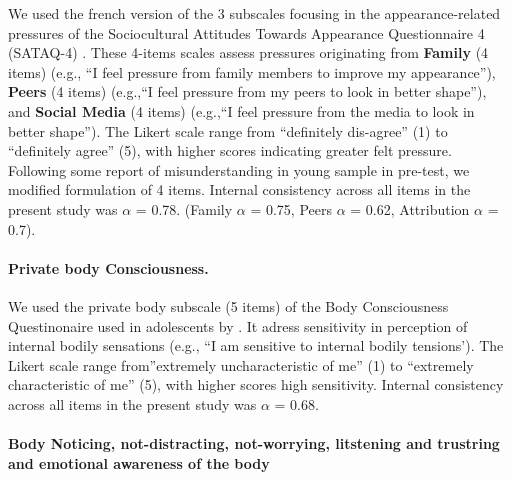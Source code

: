 \documentclass[preprint, 3p,
authoryear]{elsarticle} %
\begin{document}
We used the french version \citep{rodgers_psychometric_2016} of the 3
subscales focusing in the appearance-related pressures of the
Sociocultural Attitudes Towards Appearance Questionnaire 4 (SATAQ-4)
\citep{schaefer_development_2015}. These 4-items scales assess pressures
originating from \textbf{Family} (4 items) (e.g., ``I feel pressure from
family members to improve my appearance''), \textbf{Peers} (4 items)
(e.g.,``I feel pressure from my peers to look in better shape''), and
\textbf{Social Media} (4 items) (e.g.,``I feel pressure from the media
to look in better shape''). The Likert scale range from ``definitely
dis-agree'' (1) to ``definitely agree'' (5), with higher scores
indicating greater felt pressure. Following some report of
misunderstanding in young sample in pre-test, we modified formulation of
4 items. Internal consistency across all items in the present study was
\(\alpha\) = 0.78. (Family \(\alpha\) = 0.75, Peers \(\alpha\) = 0.62,
Attribution \(\alpha\) = 0.7).

\hypertarget{private-body-consciousness.}{%
\paragraph{Private body
Consciousness.}\label{private-body-consciousness.}}

We used the private body subscale (5 items) of the Body Consciousness
Questinonaire \citep{miller_consciousness_1981} used in adolescents by
\citet{black_gender_2010}. It adress sensitivity in perception of
internal bodily sensations (e.g., ``I am sensitive to internal bodily
tensions'). The Likert scale range from''extremely uncharacteristic of
me'' (1) to ``extremely characteristic of me'' (5), with higher scores
high sensitivity. Internal consistency across all items in the present
study was \(\alpha\) = 0.68.

\hypertarget{body-noticing-not-distracting-not-worrying-litstening-and-trustring-and-emotional-awareness-of-the-body}{%
\paragraph{Body Noticing, not-distracting, not-worrying, litstening and
trustring and emotional awareness of the
body}\label{body-noticing-not-distracting-not-worrying-litstening-and-trustring-and-emotional-awareness-of-the-body}}
\end{document}
